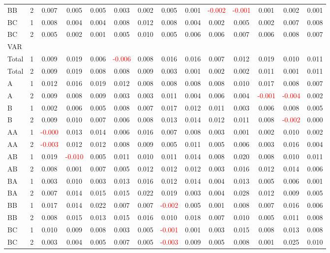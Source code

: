 \begin{table}[!htb]
{\begin{tabular}{llcccccccccccc}
BB & 2 & 0.007 & 0.005 & 0.005 & 0.003 & 0.002 & 0.005 & 0.001 & \textcolor{red}{-0.002} & \textcolor{red}{-0.001} & 0.001 & 0.002 & 0.001\\
BC & 1 & 0.008 & 0.004 & 0.004 & 0.008 & 0.012 & 0.008 & 0.004 & 0.002 & 0.005 & 0.002 & 0.007 & 0.008\\
BC & 2 & 0.005 & 0.002 & 0.001 & 0.005 & 0.010 & 0.005 & 0.006 & 0.006 & 0.007 & 0.006 & 0.008 & 0.007\\
\hline
VAR &  &  &  &  &  &  &  &  &  &  &  &  & \\
\hline
Total & 1 & 0.009 & 0.019 & 0.006 & \textcolor{red}{-0.006} & 0.008 & 0.016 & 0.016 & 0.007 & 0.012 & 0.019 & 0.010 & 0.011\\
Total & 2 & 0.009 & 0.019 & 0.008 & 0.008 & 0.009 & 0.003 & 0.001 & 0.002 & 0.002 & 0.011 & 0.001 & 0.011\\
A & 1 & 0.012 & 0.016 & 0.019 & 0.012 & 0.008 & 0.008 & 0.008 & 0.008 & 0.010 & 0.017 & 0.008 & 0.007\\
A & 2 & 0.009 & 0.008 & 0.009 & 0.003 & 0.003 & 0.011 & 0.004 & 0.006 & 0.004 & \textcolor{red}{-0.001} & \textcolor{red}{-0.004} & 0.002\\
B & 1 & 0.002 & 0.006 & 0.005 & 0.008 & 0.007 & 0.017 & 0.012 & 0.011 & 0.003 & 0.006 & 0.008 & 0.005\\
B & 2 & 0.009 & 0.010 & 0.007 & 0.006 & 0.008 & 0.013 & 0.014 & 0.012 & 0.011 & 0.008 & \textcolor{red}{-0.002} & 0.000\\
AA & 1 & \textcolor{red}{-0.000} & 0.013 & 0.014 & 0.006 & 0.016 & 0.007 & 0.008 & 0.003 & 0.001 & 0.002 & 0.010 & 0.002\\
AA & 2 & \textcolor{red}{-0.003} & 0.012 & 0.012 & 0.008 & 0.009 & 0.005 & 0.011 & 0.005 & 0.006 & 0.003 & 0.016 & 0.004\\
AB & 1 & 0.019 & \textcolor{red}{-0.010} & 0.005 & 0.011 & 0.010 & 0.011 & 0.014 & 0.008 & 0.020 & 0.008 & 0.010 & 0.011\\
AB & 2 & 0.008 & 0.001 & 0.007 & 0.005 & 0.012 & 0.012 & 0.012 & 0.003 & 0.016 & 0.012 & 0.014 & 0.006\\
BA & 1 & 0.003 & 0.010 & 0.003 & 0.013 & 0.016 & 0.012 & 0.014 & 0.004 & 0.013 & 0.005 & 0.006 & 0.001\\
BA & 2 & 0.007 & 0.014 & 0.015 & 0.015 & 0.022 & 0.019 & 0.003 & 0.004 & 0.028 & 0.012 & 0.009 & 0.005\\
BB & 1 & 0.017 & 0.014 & 0.022 & 0.007 & 0.007 & \textcolor{red}{-0.002} & 0.005 & 0.001 & 0.008 & 0.007 & 0.016 & 0.006\\
BB & 2 & 0.008 & 0.015 & 0.013 & 0.015 & 0.016 & 0.010 & 0.018 & 0.007 & 0.010 & 0.005 & 0.011 & 0.008\\
BC & 1 & 0.010 & 0.009 & 0.008 & 0.003 & 0.005 & \textcolor{red}{-0.001} & 0.001 & 0.003 & 0.015 & 0.008 & 0.013 & 0.008\\
BC & 2 & 0.003 & 0.004 & 0.005 & 0.007 & 0.005 & \textcolor{red}{-0.003} & 0.009 & 0.005 & 0.008 & 0.001 & 0.025 & 0.010\\
\hline
    \end{tabular}%
    }
\end{table}

